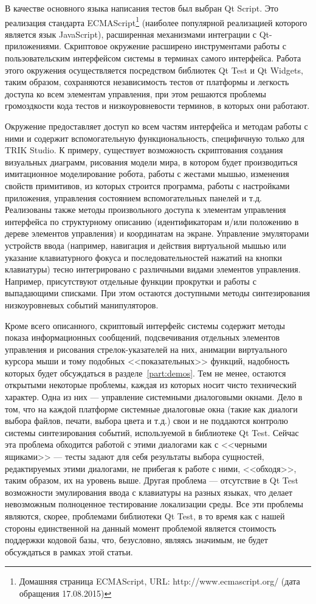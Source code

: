 \documentclass[conference]{IEEEtran}
\begin{document}
В качестве основного языка написания тестов был выбран Qt Script. Это реализация стандарта 
ECMAScript\footnote{Домашняя страница ECMAScript, URL: http://www.ecmascript.org/ (дата обращения 17.08.2015)} 
(наиболее популярной реализацией которого является язык JavaScript), расширенная механизмами интеграции 
с Qt-приложениями. Скриптовое окружение расширено инструментами работы с пользовательским интерфейсом системы 
в терминах самого интерфейса. Работа этого окружения осуществляется посредством библиотек Qt Test и Qt Widgets, 
таким образом, сохраняются независимость тестов от платформы и легкость доступа ко всем элементам управления, 
при этом решаются проблемы громоздкости кода тестов и низкоуровневости терминов, в которых они работают.

Окружение предоставляет доступ ко всем частям интерфейса и методам работы с ними и содержит вспомогательную функциональность, 
специфичную только для TRIK Studio. К примеру, существует возможность скриптования создания визуальных диаграмм, 
рисования модели мира, в котором будет производиться имитационное моделирование робота, работы с жестами мышью, 
изменения свойств примитивов, из которых строится программа, работы с настройками приложения, управления 
состоянием вспомогательных панелей и т.д. Реализованы также методы произвольного доступа к элементам управления 
интерфейса по структурному описанию (идентификаторам и/или положению в дереве элементов управления) и координатам 
на экране. Управление эмуляторами устройств ввода (например, навигация и действия виртуальной мышью или указание 
клавиатурного фокуса и последовательностей нажатий на кнопки клавиатуры) тесно интегрировано с различными 
видами элементов управления. Например, присутствуют отдельные функции прокрутки и работы с выпадающими 
списками. При этом остаются доступными методы синтезирования низкоуровневых событий манипуляторов. 

Кроме всего описанного, скриптовый интерфейс системы содержит методы показа информационных сообщений, подсвечивания 
отдельных элементов управления и рисования стрелок-указателей на них, анимации виртуального курсора мыши 
и тому подобных <<показательных>> функций, надобность которых будет обсуждаться в разделе~\ref{part:demos}. 
Тем не менее, остаются открытыми некоторые проблемы, каждая из которых носит чисто технический характер. 
Одна из них --- управление системными диалоговыми окнами. Дело в том, что на каждой платформе системные 
диалоговые окна (такие как диалоги выбора файлов, печати, выбора цвета и т.д.) свои и не поддаются контролю 
системы синтезирования событий, используемой в библиотеке Qt Test. Сейчас эта проблема обходится работой 
с этими диалогами как с <<черными ящиками>> --- тесты задают для себя результаты выбора сущностей, редактируемых 
этими диалогами, не прибегая к работе с ними, <<обходя>>, таким образом, их на уровень выше. Другая проблема 
--- отсутствие в Qt Test возможности эмулирования ввода с клавиатуры на разных языках, что делает невозможным 
полноценное тестирование локализации среды. Все эти проблемы являются, скорее, проблемами библиотеки Qt Test, 
в то время как с нашей стороны единственной на данный момент проблемой является стоимость поддержки кодовой базы, 
что, безусловно, являясь значимым, не будет обсуждаться в рамках этой статьи.
\end{document}
